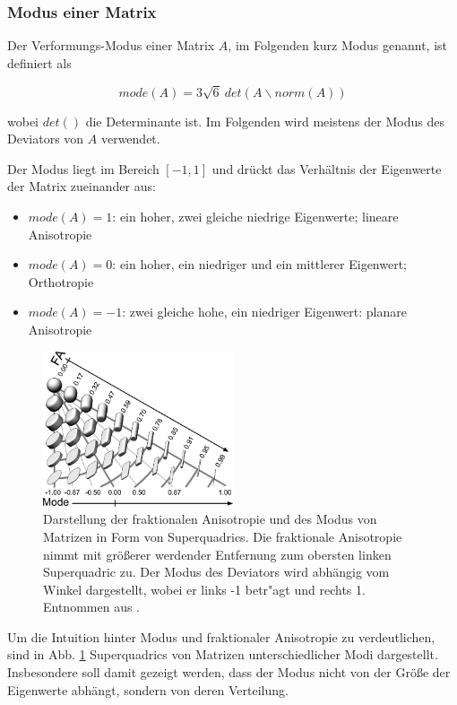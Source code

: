 \documentclass[a4paper,fontsize=12pt,toc=bib,halfparskip]{scrartcl}
\begin{document}
\subsubsection{Modus einer Matrix}
Der Verformungs-Modus \cite{criscione2000invariant} einer Matrix $A$, im Folgenden kurz Modus genannt, ist definiert als

\begin{equation}
	mode(A) = 3\sqrt{6}~det(A\backslash norm(A))
\end{equation}

wobei $det()$ die Determinante ist. Im Folgenden wird meistens der Modus des Deviators von $A$ verwendet.

Der Modus liegt im Bereich $[-1,1]$ und dr\"uckt das Verh\"altnis der Eigenwerte der Matrix zueinander aus:

\begin{itemize}
	\item $mode(A) = 1$: ein hoher, zwei gleiche niedrige Eigenwerte; lineare Anisotropie
	\item $mode(A) = 0$: ein hoher, ein niedriger und ein mittlerer Eigenwert; Orthotropie
	\item $mode(A) = -1$: zwei gleiche hohe, ein niedriger Eigenwert: planare Anisotropie
\end{itemize} 

\begin{figure}
	\centering
	\includegraphics[width=0.5\textwidth]{pictures/-001.png}
	\caption{Darstellung der fraktionalen Anisotropie und des Modus von Matrizen in Form von Superquadrics\cite{kindlmann2004superquadric}. Die fraktionale Anisotropie nimmt mit gr\"o{\ss}erer werdender Entfernung zum obersten linken Superquadric zu. Der Modus des Deviators wird abh\"angig vom Winkel dargestellt, wobei er links -1 betr"agt und rechts 1. Entnommen aus \cite[S.~140]{ennis2006orthogonal}.}
	\label{Modus}
\end{figure}
Um die Intuition hinter Modus und fraktionaler Anisotropie zu verdeutlichen, sind in Abb. \ref{Modus} Superquadrics von Matrizen unterschiedlicher Modi dargestellt. Insbesondere soll damit gezeigt werden, dass der Modus nicht von der Gr\"o{\ss}e der Eigenwerte abh\"angt, sondern von deren Verteilung.
\end{document}
